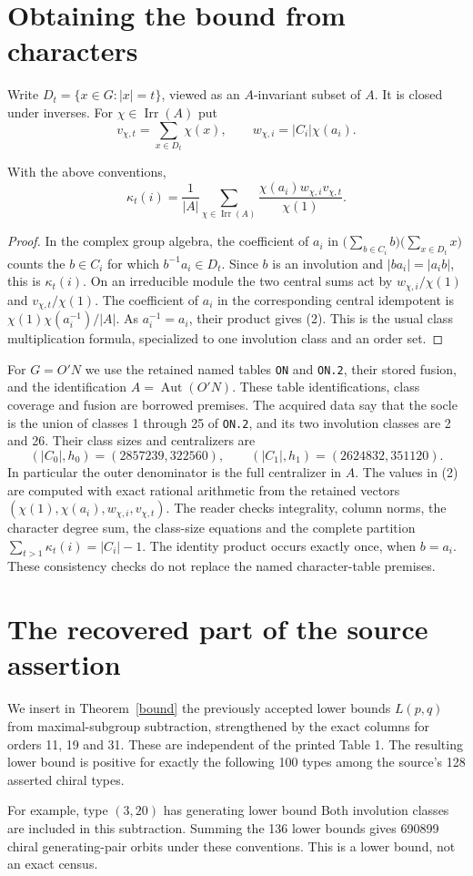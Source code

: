 \documentclass[11pt,a4paper]{article}
\newcommand{\Aut}{\operatorname{Aut}}\newcommand{\Irr}{\operatorname{Irr}}
\begin{document}
\section{Obtaining the bound from characters}
Write $D_t=\{x\in G:|x|=t\}$, viewed as an $A$-invariant subset
of $A$. It is closed under inverses. For $\chi\in\Irr(A)$ put
\[
 v_{\chi,t}=\sum_{x\in D_t}\chi(x),\qquad
 w_{\chi,i}=|C_i|\chi(a_i).
\]
\begin{lemma}\label{characters}
With the above conventions,
\[
 \kappa_t(i)=\frac1{|A|}\sum_{\chi\in\Irr(A)}
       \frac{\chi(a_i)w_{\chi,i}v_{\chi,t}}{\chi(1)}.       \tag{2}
\]
\end{lemma}
\begin{proof}
In the complex group algebra, the coefficient of $a_i$ in
$\bigl(\sum_{b\in C_i}b\bigr)\bigl(\sum_{x\in D_t}x\bigr)$
counts the $b\in C_i$ for which $b^{-1}a_i\in D_t$.
Since $b$ is an involution and $|ba_i|=|a_i b|$, this is
$\kappa_t(i)$. On an irreducible module the two central sums act
by $w_{\chi,i}/\chi(1)$ and $v_{\chi,t}/\chi(1)$.
The coefficient of $a_i$ in the corresponding central idempotent is
$\chi(1)\chi(a_i^{-1})/|A|$. As $a_i^{-1}=a_i$, their product
gives (2). This is the usual class multiplication formula, specialized
to one involution class and an order set.
\end{proof}

For $G=O'N$ we use the retained named tables \texttt{ON} and
\texttt{ON.2}, their stored fusion, and the identification
$A=\Aut(O'N)$. These table identifications, class coverage and fusion
are borrowed premises. The acquired data say that the socle is the
union of classes 1 through 25 of \texttt{ON.2}, and its two involution
classes are 2 and 26. Their class sizes and centralizers are
\[
 (|C_0|,h_0)=(2857239,322560),\qquad
 (|C_1|,h_1)=(2624832,351120).
\]
In particular the outer denominator is the full centralizer in $A$.
The values in (2) are computed with exact rational arithmetic from the
retained vectors $(\chi(1),\chi(a_i),w_{\chi,i},v_{\chi,t})$.
The reader checks integrality, column norms, the character degree sum,
the class-size equations and the complete partition
$\sum_{t>1}\kappa_t(i)=|C_i|-1$. The identity product occurs exactly
once, when $b=a_i$. These consistency checks do not replace the named
character-table premises.


\section{The recovered part of the source assertion}
We insert in Theorem~\ref{bound} the previously accepted lower bounds
$L(p,q)$ from maximal-subgroup subtraction, strengthened by the exact
columns for orders 11, 19 and 31. These are independent of the printed
Table 1. The resulting lower bound is positive for exactly the following
100 types among the source's 128 asserted chiral types.

For example, type $(3,20)$ has generating lower bound
Both involution classes are included in this subtraction.
Summing the 136 lower bounds gives 690899 chiral generating-pair orbits
under these conventions. This is a lower bound, not an exact census.
\end{document}
